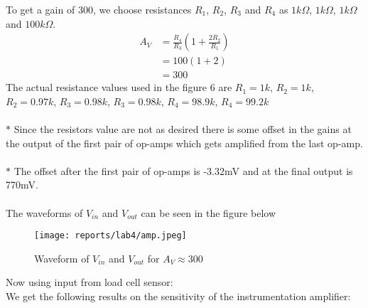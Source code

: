 \documentclass[12pt]{article}
\begin{document}
        \noindent
        To get a gain of 300, we choose resistances $R_1$, $R_2$, $R_3$ and $R_4$ as $1k\Omega$, $1k\Omega$, $1k\Omega$ and $100k\Omega$.
        \begin{align*} 
            A_V & = \frac{R_4}{R_3}(1 + \frac{2R_2}{R_1})\\
                & = 100(1 + 2)\\
                & = 300
        \end{align*}
        \noindent
        The actual resistance values used in the figure 6 are $R_1 = 1k$, $R_2 = 1k$, $R_2 = 0.97k$, $R_3 = 0.98k$, $R_3 = 0.98k$, $R_4 = 98.9k$, $R_4 = 99.2k$
        \\\\
        $\ast$ Since the resistors value are not as desired there is some offset in the gains at the output of the first pair of op-amps which gets amplified from the last op-amp.
        \\\\
        \noindent
        $\ast$ The offset after the first pair of op-amps is -3.32mV and at the final output is 770mV.
        \\\\
        \noindent
        The waveforms of $V_{in}$ and $V_{out}$ can be seen in the figure below
        \begin{figure}[H]
            \centering
            \texttt{[image: reports/lab4/amp.jpeg]}
            \caption{Waveform of $V_{in}$ and $V_{out}$ for $A_V \approx 300$}
        \end{figure}
        \noindent
        Now using input from load cell sensor:
        \\
        We get the following results on the sensitivity of the instrumentation amplifier:
        
\end{document}
